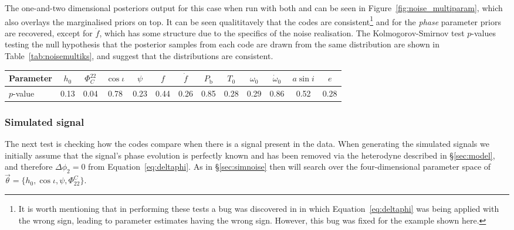The one-and-two dimensional posteriors output for this case when run with both \lppe and \lppen can be seen in Figure~\ref{fig:noise_multiparam},
which also overlays the marginalised priors on top. It can be seen qualititavely that the codes are consistent\footnote{It is worth mentioning that in performing
these tests a bug was discovered in \lppe in which Equation~\ref{eq:deltaphi} was being applied with the wrong sign, leading to parameter estimates
having the wrong sign. However, this bug was fixed for the example shown here.} and for the {\it phase} parameter priors are recovered, except for
$\dot{f}$, which has some structure due to the specifics of the noise realisation. The Kolmogorov-Smirnov test $p$-values testing the null hypothesis
that the posterior samples from each code are drawn from the same distribution are shown in Table~\ref{tab:noisemultiks}, and suggest that the
distributions are consistent.

\begin{table*}[hptb]
\caption{Kolmogorov-Smirnov test $p$-values testing the null hypothesis that the samples output by \lppen and \lppe, when running on simulated
noise data and searching over the twelve parameters $\{h_0, \cos{\iota}, \psi, \Phi_{22}^C, f,\dot{f},P_{\text{b}}, T_0, \omega_0, \dot{\omega}_0, a\sin{i}, e\}$,
are drawn from the same distributions.\label{tab:noisemultiks}}
\begin{center}
\begin{tabular}{l | c c c c c c c c c c c c}
\hline
Parameter & $h_0$ & $\Phi_C^{22}$ & $\cos{\iota}$ & $\psi$ & $f$ & $\dot{f}$ & $P_{\text{b}}$ & $T_0$ & $\omega_0$ & $\dot{\omega}_0$ & $a\sin{i}$ & $e$ \\                      
\hline
\hline
$p$-value  & 0.13 & 0.04 & 0.78 & 0.23 & 0.44 & 0.26 & 0.85 & 0.28 & 0.29 & 0.86 & 0.52 & 0.28 \\
\hline
\end{tabular}
\end{center}
\end{table*}

\subsubsection{Simulated signal}

The next test is checking how the codes compare when there is a signal present in the data. When generating the simulated signals we initially
assume that the signal's phase evolution is perfectly known and has been removed via the heterodyne described in \S\ref{sec:model}, and therefore
$\Delta\phi_2 = 0$ from Equation~\ref{eq:deltaphi}. As in \S\ref{sec:simnoise} then will search over the four-dimensional parameter space of
$\vec{\theta} = \{h_0, \cos{\iota}, \psi, \Phi_{22}^C\}$.

